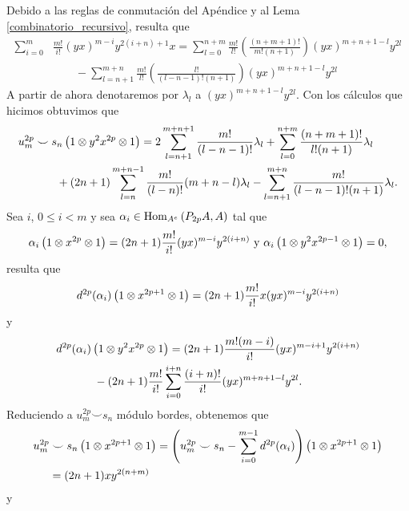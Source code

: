 \documentclass[fleqn,../tesis.tex]{subfiles}
\begin{document}
Debido a las reglas de conmutación del Apéndice y al Lema \ref{combinatorio_recursivo}, resulta que
\begin{align*}
	\sum_{i = 0}^{m} & \frac{m!}{i!}(yx)^{m - i}y^{2(i + n) + 1}x
		= \sum_{l = 0}^{n + m}\frac{m!}{l!}\left(\frac{(n + m + 1)!}{m!(n + 1)}\right)(yx)^{m + n + 1 - l}y^{2l}\\
	&\qquad -\sum_{l = n + 1}^{m + n}\frac{m!}{l!}\left(\frac{l!}{(l - n - 1)!(n + 1)}\right)(yx)^{m + n + 1 - l}y^{2l}
\end{align*}
A partir de ahora denotaremos por $\lambda_l$ a $(yx)^{m + n + 1 - l}y^{2l}$. Con los cálculos que hicimos obtuvimos que
\begin{align*}
	u_m^{2p}& \smile s_n\left(1 \otimes y^2x^{2p} \otimes 1\right) =
		2\sum_{l = n + 1}^{m + n + 1}\frac{m!}{(l - n - 1)!}\lambda_l
		+\sum_{l = 0}^{n + m}\frac{(n + m + 1)!}{l!(n + 1)}\lambda_l\\
	&\qquad+ (2n + 1)\sum_{l = n}^{m + n - 1}\frac{m!}{(l - n)!}(m + n - l)\lambda_l
		-\sum_{l = n + 1}^{m + n}\frac{m!}{(l - n - 1)!(n + 1)}\lambda_l.
\end{align*}
Sea $i$, $0 \leq i < m$ y sea $\alpha_i \in \operatorname{Hom}_{A^e}\left(P_{2p}A, A\right)$ tal que
\[
	\alpha_i\left(1\otimes x^{2p} \otimes 1\right) = (2n + 1)\frac{m!}{i!}(yx)^{m - i}y^{2(i + n)}
	\text{ y } \alpha_i\left(1\otimes y^2x^{2p - 1} \otimes 1\right) = 0,
\]
resulta que
\begin{align*}
	d^{2p}(\alpha_i)\left(1 \otimes x^{2p + 1}\otimes 1\right) = (2n + 1)\frac{m!}{i!}x(yx)^{m - i}y^{2(i + n)}
\end{align*}
y
\begin{align*}
	d^{2p}&(\alpha_i)\left(1 \otimes y^2x^{2p}\otimes 1\right) =
		(2n + 1)\frac{m!(m  - i)}{i!}(yx)^{m - i + 1}y^{2(i + n)}\\
	&\qquad- (2n + 1)\frac{m!}{i!}\sum_{i = 0}^{i + n}\frac{(i + n)!}{i!}(yx)^{m + n + 1 - l}y^{2l}.
\end{align*}
Reduciendo a $u_m^{2p} \smile s_n$ módulo bordes, obtenemos que
\begin{align*}
	u_m^{2p}& \smile s_n\left(1 \otimes x^{2p + 1} \otimes 1\right) = 
		\left(u_m^{2p} \smile s_n - \sum_{i =0}^{m - 1}d^{2p}(\alpha_i)\right)
		\left(1 \otimes x^{2p + 1} \otimes 1\right)\\ &= (2n + 1)xy^{2(n + m)}
\end{align*}
y
\end{document}
